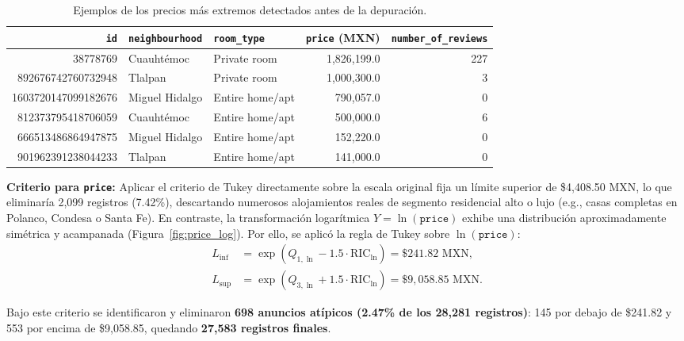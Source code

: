 \documentclass[12pt,letterpaper,oneside]{report}
\begin{document}
\begin{table}[htbp]
\centering
\caption{Ejemplos de los precios más extremos detectados antes de la depuración.}
\label{tab:precios_extremos}
\scriptsize
\renewcommand{\arraystretch}{1.15}
\begin{tabular}{r l l r r}
\toprule
\rowcolor{TableHeader}
\textbf{\texttt{id}} & \textbf{\texttt{neighbourhood}} & \textbf{\texttt{room\_type}} & \textbf{\texttt{price} (MXN)} & \textbf{\texttt{number\_of\_reviews}} \\
\midrule
38778769            & Cuauhtémoc     & Private room    & 1,826,199.0 & 227 \\
892676742760732948  & Tlalpan        & Private room    & 1,000,300.0 &   3 \\
1603720147099182676 & Miguel Hidalgo & Entire home/apt &   790,057.0 &   0 \\
812373795418706059  & Cuauhtémoc     & Entire home/apt &   500,000.0 &   6 \\
666513486864947875  & Miguel Hidalgo & Entire home/apt &   152,220.0 &   0 \\
901962391238044233  & Tlalpan        & Entire home/apt &   141,000.0 &   0 \\
\bottomrule
\end{tabular}
\end{table}

\textbf{Criterio para \texttt{price}:} Aplicar el criterio de Tukey directamente sobre la escala original fija un límite superior de \$4,408.50 MXN, lo que eliminaría 2,099 registros (7.42\%), descartando numerosos alojamientos reales de segmento residencial alto o lujo (e.g., casas completas en Polanco, Condesa o Santa Fe). En contraste, la transformación logarítmica $Y = \ln(\texttt{price})$ exhibe una distribución aproximadamente simétrica y acampanada (Figura~\ref{fig:price_log}). Por ello, se aplicó la regla de Tukey sobre $\ln(\texttt{price})$:
\begin{align*}
L_{\inf} &= \exp\!\left(Q_{1,\ln} - 1.5\cdot \text{RIC}_{\ln}\right) = \$241.82\text{ MXN}, \\
L_{\sup} &= \exp\!\left(Q_{3,\ln} + 1.5\cdot \text{RIC}_{\ln}\right) = \$9{,}058.85\text{ MXN}.
\end{align*}

Bajo este criterio se identificaron y eliminaron \textbf{698 anuncios atípicos (2.47\% de los 28,281 registros)}: 145 por debajo de \$241.82 y 553 por encima de \$9,058.85, quedando \textbf{27,583 registros finales}.
\end{document}
